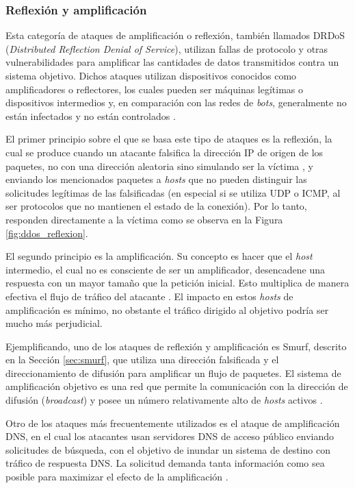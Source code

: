 \subsubsection*{Reflexión y amplificación}

Esta categoría de ataques de amplificación o reflexión, también llamados DRDoS
(\textit{Distributed Reflection Denial of Service}), utilizan fallas de
protocolo y otras vulnerabilidades para amplificar las cantidades de datos
transmitidos contra un sistema objetivo. Dichos ataques utilizan dispositivos
conocidos como amplificadores o reflectores, los cuales pueden ser máquinas
legítimas o dispositivos intermedios y, en comparación con las redes de
\textit{bots}, generalmente no están infectados y no están controlados
\parencite{drdos_kumar}.

El primer principio sobre el que se basa este tipo de ataques es la reflexión,
la cual se produce cuando un atacante falsifica la dirección IP de origen de los
paquetes, no con una dirección aleatoria sino simulando ser la víctima
\parencite{ddos_amir}, y enviando los mencionados paquetes a \textit{hosts} que
no pueden distinguir las solicitudes legítimas de las falsificadas (en especial
si se utiliza UDP o ICMP, al ser protocolos que no mantienen el estado de la
conexión). Por lo tanto, responden directamente a la víctima como se observa en
la Figura \ref{fig:ddos_reflexion}.

El segundo principio es la amplificación. Su concepto es hacer que el
\textit{host} intermedio, el cual no es consciente de ser un amplificador,
desencadene una respuesta con un mayor tamaño que la petición inicial. Esto
multiplica de manera efectiva el flujo de tráfico del atacante
\parencite{ddos_andre}. El impacto en estos \textit{hosts} de amplificación es
mínimo, no obstante el tráfico dirigido al objetivo podría ser mucho más
perjudicial.

Ejemplificando, uno de los ataques de reflexión y amplificación es Smurf,
descrito en la Sección \ref{sec:smurf}, que utiliza una dirección falsificada
y el direccionamiento de difusión para amplificar un flujo de paquetes. El
sistema de amplificación objetivo es una red que permite la comunicación con la
dirección de difusión (\textit{broadcast}) y posee un número relativamente alto
de \textit{hosts} activos \parencite{art_exploit}.

Otro de los ataques más frecuentemente utilizados es el ataque de amplificación
DNS, en el cual los atacantes usan servidores DNS de acceso público enviando
solicitudes de búsqueda, con el objetivo de inundar un sistema de destino con
tráfico de respuesta DNS. La solicitud demanda tanta información como sea
posible para maximizar el efecto de la amplificación \parencite{CISA}.


